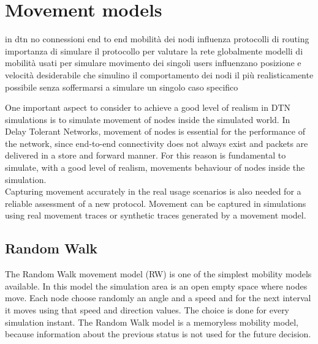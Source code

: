 
\chapter{Movement models}\label{movimento} %





in dtn no connessioni end to end
mobilità dei nodi influenza protocolli di routing
importanza di simulare il protocollo per valutare la rete globalmente
modelli di mobilità usati per simulare movimento dei singoli users 
influenzano posizione e velocità
desiderabile che simulino il comportamento dei nodi il più realisticamente possibile
senza soffermarsi a simulare un singolo caso specifico



One important aspect to consider to achieve a good level of realism in DTN simulations is to simulate movement of nodes inside the simulated world. In Delay Tolerant Networks, movement of nodes is essential for the performance of the network, since end-to-end connectivity does not always exist and packets are delivered in a store and forward manner. For this reason is fundamental to simulate, with a good level of realism, movements behaviour of nodes inside the simulation.
\\

Capturing movement accurately in the real usage scenarios is also needed for a reliable assessment of a new protocol. Movement can be captured in simulations using real movement traces or synthetic traces generated by a movement model.

\section{Random Walk}
The Random Walk movement model (RW) is one of the simplest mobility models available. In this model the simulation area is an open empty space where nodes move. Each node choose randomly an angle and a speed and for the next interval it moves using that speed and direction values. The choice is done for every simulation instant. The Random Walk model is a memoryless mobility model, because information about the previous status is not used for the future decision. 



